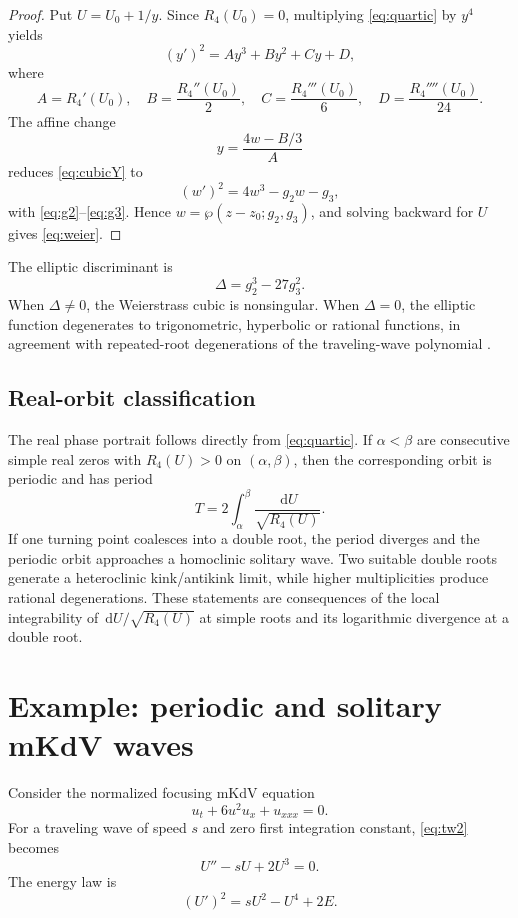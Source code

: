\documentclass[11pt]{article}
\newcommand{\dd}{\,\mathrm{d}}
\newcommand{\wpF}{\wp}
\begin{document}
\begin{proof}
Put $U=U_0+1/y$.  Since $R_4(U_0)=0$, multiplying \eqref{eq:quartic} by $y^4$ yields
\begin{equation}
 (y')^2=Ay^3+By^2+Cy+D,
 \label{eq:cubicY}
\end{equation}
where
\[
 A=R_4'(U_0),\quad
 B=\frac{R_4''(U_0)}{2},\quad
 C=\frac{R_4'''(U_0)}{6},\quad
 D=\frac{R_4''''(U_0)}{24}.
\]
The affine change
\[
 y=\frac{4w-B/3}{A}
\]
reduces \eqref{eq:cubicY} to
\[
 (w')^2=4w^3-g_2w-g_3,
\]
with \eqref{eq:g2}--\eqref{eq:g3}.  Hence $w=\wpF(z-z_0;g_2,g_3)$, and solving backward for $U$ gives \eqref{eq:weier}.
\end{proof}

The elliptic discriminant is
\begin{equation}
 \Delta=g_2^3-27g_3^2.
 \label{eq:disc}
\end{equation}
When $\Delta\ne0$, the Weierstrass cubic is nonsingular.  When $\Delta=0$, the elliptic function degenerates to trigonometric, hyperbolic or rational functions, in agreement with repeated-root degenerations of the traveling-wave polynomial \citep{whittaker1927,lawden1989,byrd1971}.

\subsection{Real-orbit classification}
The real phase portrait follows directly from \eqref{eq:quartic}.  If $\alpha<\beta$ are consecutive simple real zeros with $R_4(U)>0$ on $(\alpha,\beta)$, then the corresponding orbit is periodic and has period
\begin{equation}
 T=2\int_{\alpha}^{\beta}\frac{\dd U}{\sqrt{R_4(U)}}.
 \label{eq:period}
\end{equation}
If one turning point coalesces into a double root, the period diverges and the periodic orbit approaches a homoclinic solitary wave.  Two suitable double roots generate a heteroclinic kink/antikink limit, while higher multiplicities produce rational degenerations.  These statements are consequences of the local integrability of $\dd U/\sqrt{R_4(U)}$ at simple roots and its logarithmic divergence at a double root.

\section{Example: periodic and solitary mKdV waves}
Consider the normalized focusing mKdV equation
\begin{equation}
 u_t+6u^2u_x+u_{xxx}=0.
 \label{eq:fmkdv}
\end{equation}
For a traveling wave of speed $s$ and zero first integration constant, \eqref{eq:tw2} becomes
\begin{equation}
 U''-sU+2U^3=0.
 \label{eq:mkdvODE}
\end{equation}
The energy law is
\begin{equation}
 (U')^2=sU^2-U^4+2E.
 \label{eq:mkdvenergy}
\end{equation}
\end{document}
